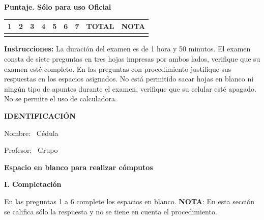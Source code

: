 \documentclass[11pt]{article}
\begin{document}
\examheader

\vspace{4pt}
\noindent
\begin{minipage}[t]{0.62\linewidth}
\textbf{Puntaje. Sólo para uso Oficial}\\[4pt]
\begin{tabular}{|c|c|c|c|c|c|c|c|c|}
\hline
1 & 2 & 3 & 4 & 5 & 6 & 7 & \textbf{TOTAL} & \textbf{NOTA} \\ \hline
 & & & & & & & & \\ \hline
\end{tabular}
\end{minipage}

\vspace{6pt}
\noindent\textbf{Instrucciones:} La duración del examen es de 1 hora y 50 minutos. El examen consta de siete preguntas en tres hojas impresas por ambos lados, verifique que su examen esté completo. En las preguntas con procedimiento justifique sus respuestas en los espacios asignados. No está permitido sacar hojas en blanco ni ningún tipo de apuntes durante el examen, verifique que su celular esté apagado. No se permite el uso de calculadora.

\vspace{6pt}
\noindent\textbf{IDENTIFICACIÓN}

\vspace{8pt}
\noindent Nombre: \dotfill\ Cédula \dotfill

\vspace{4pt}
\noindent Profesor: \dotfill\ Grupo \dotfill

\vspace{6pt}
\begin{center}
\textbf{Espacio en blanco para realizar cómputos}
\end{center}

\newpage
\noindent\textbf{\large I. Completación}

\vspace{2pt}
\noindent En las preguntas 1 a 6 complete los espacios en blanco. \textbf{NOTA}: En esta sección se califica sólo la respuesta y no se tiene en cuenta el procedimiento.
\end{document}
